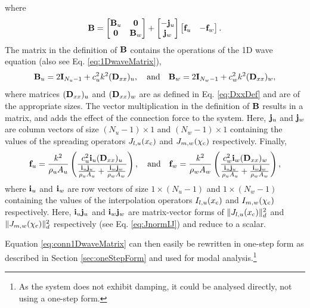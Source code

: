 where 
\begin{equation*}
    \mathbf{B} = \begin{bmatrix}
        \mathbf{B}_u & \mathbf{0}\\
        \mathbf{0} & \mathbf{B}_w 
    \end{bmatrix} + \begin{bmatrix}
        -\mathbf{j}_u\\
        \mathbf{j}_w
    \end{bmatrix}
    \begin{bmatrix}
        \mathbf{f}_u& -\mathbf{f}_w
    \end{bmatrix}.
\end{equation*}
The matrix in the definition of $\mathbf{B}$ contains the operations of the 1D wave equation (also see Eq. \eqref{eq:1DwaveMatrix}),
\begin{equation}    
    \mathbf{B}_u = 2\mathbf{I}_{N_u-1} +c_u^2k^2 (\mathbf{D}_{xx})_u, \quad \text{and} \quad \mathbf{B}_w = 2\mathbf{I}_{N_w-1} +c_w^2k^2 (\mathbf{D}_{xx})_w,
\end{equation}
where matrices $(\mathbf{D}_{xx})_u$ and $(\mathbf{D}_{xx})_w$ are as defined in Eq. \eqref{eq:DxxDef} and are of the appropriate sizes. The vector multiplication in the definition of $\mathbf{B}$ results in a matrix, and adds the effect of the connection force to the system. Here, $\mathbf{j}_u$ and $\mathbf{j}_w$ are column vectors of size $(N_u-1)\times 1$ and $(N_w-1)\times 1$ containing the values of the spreading operators $J_{l, u}(x_{\text{c}})$ and $J_{m, w}(\chi_{\text{c}})$ respectively. Finally,
\begin{equation*}
    \mathbf{f}_u = \frac{k^2}{\rho_uA_u} \left(\frac{c_u^2\mathbf{i}_u(\mathbf{D}_{xx})_u}{\frac{\mathbf{i}_u \mathbf{j}_u}{ \rho_u A_u} + \frac{\mathbf{i}_w \mathbf{j}_w}{\rho_w A_w}}\right), \quad \text{and} \quad \mathbf{f}_w =  \frac{k^2}{\rho_wA_w}\left(\frac{c_w^2 \mathbf{i}_w(\mathbf{D}_{xx})_w}{\frac{\mathbf{i}_u \mathbf{j}_u}{ \rho_u A_u} + \frac{\mathbf{i}_w \mathbf{j}_w}{\rho_w A_w}}\right),
\end{equation*}
where $\mathbf{i}_u$ and $\mathbf{i}_w$ are row vectors of size $1\times (N_u-1)$ and $1\times (N_w-1)$ containing the values of the interpolation operators $I_{l, u}(x_{\text{c}})$ and $I_{m, w}(\chi_{\text{c}})$ respectively. Here, $\mathbf{i}_u\mathbf{j}_u$ and $\mathbf{i}_w\mathbf{j}_w$ are matrix-vector forms of $\lVert J_{l, u}(x_{\text{c}})\rVert_d^2$ and $\lVert J_{m, w}(\chi_{\text{c}})\rVert_d^2$ respectively (see Eq. \eqref{eq:JnormIJ}) and reduce to a scalar. 

Equation \eqref{eq:conn1DwaveMatrix} can then easily be rewritten in one-step form as described in Section \ref{sec:oneStepForm} and used for modal analysis.\footnote{As the system does not exhibit damping, it could be analysed directly, not using a one-step form.}

